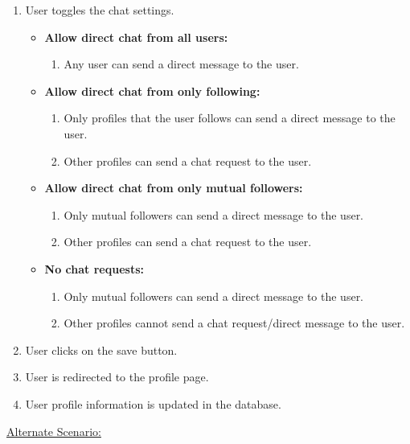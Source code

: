 \documentclass[conference,compsoc]{IEEEtran}
\begin{document}
\begin{enumerate}
    \item User toggles the chat settings.
          \begin{itemize}
              \item \textbf{Allow direct chat from all users:}
                    \begin{enumerate}
                        \item Any user can send a direct message to the user.
                    \end{enumerate}
              \item \textbf{Allow direct chat from only following:}
                    \begin{enumerate}
                        \item Only profiles that the user follows can send a direct message to the user.
                        \item Other profiles can send a chat request to the user.
                    \end{enumerate}
              \item \textbf{Allow direct chat from only mutual followers:}
                    \begin{enumerate}
                        \item Only mutual followers can send a direct message to the user.
                        \item Other profiles can send a chat request to the user.
                    \end{enumerate}
              \item \textbf{No chat requests:}
                    \begin{enumerate}
                        \item Only mutual followers can send a direct message to the user.
                        \item Other profiles cannot send a chat request/direct message to the user.
                    \end{enumerate}
          \end{itemize}
    \item User clicks on the save button.
    \item User is redirected to the profile page.
    \item User profile information is updated in the database.
\end{enumerate}

\underline{Alternate Scenario:}\\
\end{document}
